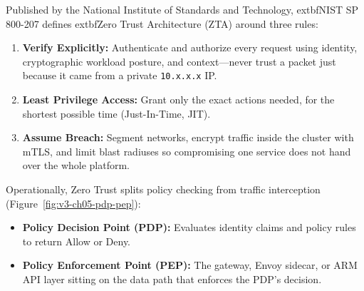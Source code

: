 Published by the National Institute of Standards and Technology, 	extbf{NIST SP 800-207} defines 	extbf{Zero Trust Architecture (ZTA)} around three rules:
\begin{enumerate}[leftmargin=15pt]
  \item \textbf{Verify Explicitly:} Authenticate and authorize every request using identity, cryptographic workload posture, and context—never trust a packet just because it came from a private \texttt{10.x.x.x} IP.
  \item \textbf{Least Privilege Access:} Grant only the exact actions needed, for the shortest possible time (Just-In-Time, JIT).
  \item \textbf{Assume Breach:} Segment networks, encrypt traffic inside the cluster with mTLS, and limit blast radiuses so compromising one service does not hand over the whole platform.
\end{enumerate}

Operationally, Zero Trust splits policy checking from traffic interception (Figure~\ref{fig:v3-ch05-pdp-pep}):
\begin{itemize}[leftmargin=12pt]
  \item \textbf{Policy Decision Point (PDP):} Evaluates identity claims and policy rules to return Allow or Deny.
  \item \textbf{Policy Enforcement Point (PEP):} The gateway, Envoy sidecar, or ARM API layer sitting on the data path that enforces the PDP's decision.
\end{itemize}

